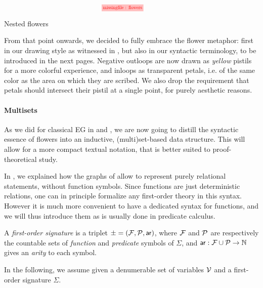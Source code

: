 \begin{marginfigure}
  $$
  \!\!\!\!
  \!\!\!\!
  \!\!\!\!
  \!\!\!\!
  \stkfig{0.65}{flowers}
  $$
  \vspace{-3em}
  \caption{Nested flowers}
\end{marginfigure}

From that point onwards, we decided to fully embrace the flower metaphor: first
in our drawing style as witnessed in , but also in our syntactic
terminology, to be introduced in the next pages. Negative outloops are now drawn
as \emph{yellow} pistils for a more colorful experience, and inloops as
transparent petals, i.e. of the same color as the area on which they are
scribed. We also drop the requirement that petals should intersect their pistil
at a single point, for purely aesthetic reasons.

\paragraph{Multisets}

As we did for classical EG in  and , we are
now going to distill the syntactic essence of flowers into an inductive,
(multi)set-based data structure. This will allow for a more compact textual
notation, that is better suited to proof-theoretical study.

In , we explained how the graphs of  allow to represent
purely relational statements, without function symbols. Since functions are just
deterministic relations, one can in principle formalize any first-order theory
in this syntax. However it is much more convenient to
have a dedicated syntax for functions, and we will thus introduce them as is
usually done in predicate calculus.

\begin{definition}
  A \emph{first-order signature} is a triplet $\mathcal{\Sigma} = (
  \mathcal{F}, \mathcal{P}, \mathsf{ar} )$, where $\mathcal{F}$ and $\mathcal{P}$ are
  respectively the countable sets of \emph{function} and \emph{predicate}
  symbols of $\Sigma$, and $\mathsf{ar} : \mathcal{F} \cup \mathcal{P} \to \mathbb{N}$ gives an
  \emph{arity} to each symbol.
\end{definition}

In the following, we assume given a denumerable set of variables $\mathcal{V}$
and a first-order signature $\Sigma$.

